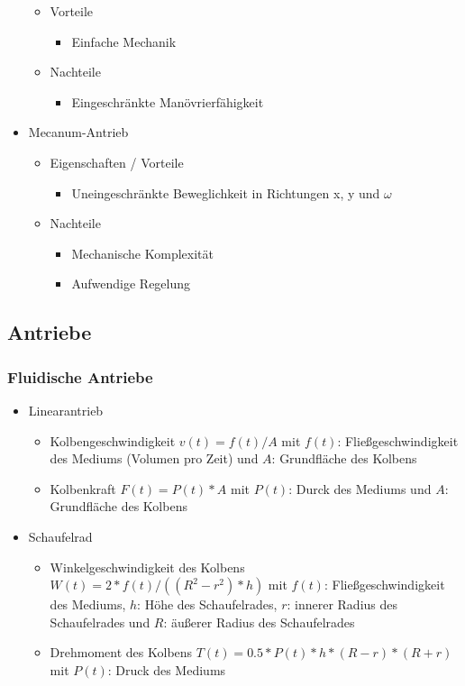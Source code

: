 \documentclass[paper=a4, fontsize=11pt]{scrartcl} %
\numberwithin{equation}{section} %
\numberwithin{figure}{section} %
\numberwithin{table}{section} %
\begin{document}
\begin{itemize}
\begin{itemize}
\begin{itemize}
\end{itemize}
\item Vorteile
\begin{itemize}
\item Einfache Mechanik
\end{itemize}
\item Nachteile
\begin{itemize}
\item Eingeschränkte Manövrierfähigkeit
\end{itemize}
\end{itemize}
\item Mecanum-Antrieb
\begin{itemize}
\item Eigenschaften / Vorteile
\begin{itemize}
\item Uneingeschränkte Beweglichkeit in Richtungen x, y und $\omega$
\end{itemize}
\item Nachteile
\begin{itemize}
\item Mechanische Komplexität
\item Aufwendige Regelung
\end{itemize}
\end{itemize}
\end{itemize}

\subsection{Antriebe}

\subsubsection{Fluidische Antriebe}

\begin{itemize}
\item Linearantrieb
\begin{itemize}
\item Kolbengeschwindigkeit $v(t) = f(t) / A$ mit $f(t)$: Fließgeschwindigkeit des Mediums (Volumen pro Zeit) und $A$: Grundfläche des Kolbens
\item Kolbenkraft $F(t) = P(t) * A$ mit $P(t)$: Durck des Mediums und $A$: Grundfläche des Kolbens
\end{itemize}
\item Schaufelrad
\begin{itemize}
\item Winkelgeschwindigkeit des Kolbens $W(t) = 2 * f(t) / ((R^2 - r^2) * h)$ mit $f(t)$: Fließgeschwindigkeit des Mediums, $h$: Höhe des Schaufelrades, $r$: innerer Radius des Schaufelrades und $R$: äußerer Radius des Schaufelrades
\item Drehmoment des Kolbens $T(t) = 0.5 * P(t) * h * (R - r) * (R + r)$ mit $P(t)$: Druck des Mediums
\end{itemize}
\end{itemize}
\end{document}
